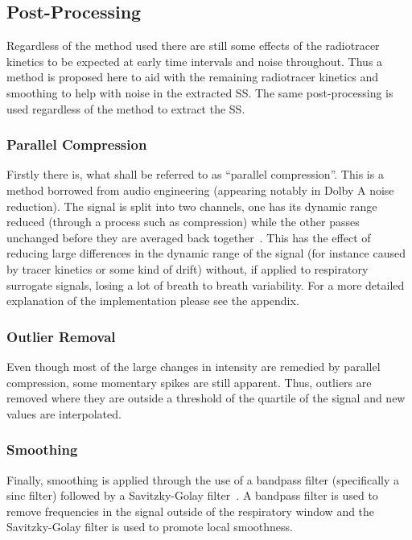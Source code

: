     \subsection{Post-Processing} \label{sec:post_processing}
        Regardless of the method used there are still some effects of the radiotracer kinetics to be expected at early time intervals and noise throughout. Thus a method is proposed here to aid with the remaining radiotracer kinetics and smoothing to help with noise in the extracted \gls{SS}. The same post-processing is used regardless of the method to extract the \gls{SS}.
            
        \subsubsection{Parallel Compression} \label{sec:parallel_compression}   
            Firstly there is, what shall be referred to as ``parallel compression''. This is a method borrowed from audio engineering (appearing notably in Dolby A noise reduction). The signal is split into two channels, one has its dynamic range reduced (through a process such as compression) while the other passes unchanged before they are averaged back together~\parencite{Izhaki2012MixingTools}. This has the effect of reducing large differences in the dynamic range of the signal (for instance caused by tracer kinetics or some kind of drift) without, if applied to respiratory surrogate signals, losing a lot of breath to breath variability. For a more detailed explanation of the implementation please see the appendix.

        \subsubsection{Outlier Removal} \label{sec:outlier_removal}
            Even though most of the large changes in intensity are remedied by parallel compression, some momentary spikes are still apparent. Thus, outliers are removed where they are outside a threshold of the quartile of the signal and new values are interpolated.

        \subsubsection{Smoothing} \label{sec:smoothing}
            Finally, smoothing is applied through the use of a bandpass filter (specifically a sinc filter) followed by a Savitzky-Golay filter~\parencite{Savitzky1964SmoothingProcedures}. A bandpass filter is used to remove frequencies in the signal outside of the respiratory window and the Savitzky-Golay filter is used to promote local smoothness.

